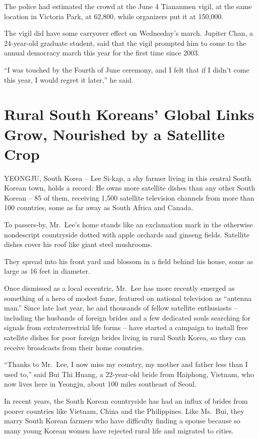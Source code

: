 ﻿\documentclass[12pt]{article}
\begin{document}
The police had estimated the crowd at the June 4 Tiananmen vigil, at the same location in Victoria
Park, at 62,800, while organizers put it at 150,000.

The vigil did have some carryover effect on Wednesday's march. Jupiter Chan, a 24-year-old graduate
student, said that the vigil prompted him to come to the annual democracy march this year for the
first time since 2003.

``I was touched by the Fourth of June ceremony, and I felt that if I didn't come this year, I would
regret it later,'' he said.

\section{Rural South Koreans' Global Links Grow, Nourished by a Satellite Crop}

YEONGJU, South Korea -- Lee Si-kap, a shy farmer living in this central South Korean town, holds a
record: He owns more satellite dishes than any other South Korean -- 85 of them, receiving 1,500
satellite television channels from more than 100 countries, some as far away as South Africa and
Canada.

To passers-by, Mr.~Lee's home stands like an exclamation mark in the otherwise nondescript
countryside dotted with apple orchards and ginseng fields. Satellite dishes cover his roof like
giant steel mushrooms.

They spread into his front yard and blossom in a field behind his house, some as large as 16 feet in
diameter.

Once dismissed as a local eccentric, Mr.~Lee has more recently emerged as something of a hero of
modest fame, featured on national television as ``antenna man.'' Since late last year, he and
thousands of fellow satellite enthusiasts -- including the husbands of foreign brides and a few
dedicated souls searching for signals from extraterrestrial life forms -- have started a campaign to
install free satellite dishes for poor foreign brides living in rural South Korea, so they can
receive broadcasts from their home countries.

``Thanks to Mr.~Lee, I now miss my country, my mother and father less than I used to,'' said Bui Thi
Huang, a 22-year-old bride from Haiphong, Vietnam, who now lives here in Yeongju, about 100 miles
southeast of Seoul.

In recent years, the South Korean countryside has had an influx of brides from poorer countries like
Vietnam, China and the Philippines. Like Ms.~Bui, they marry South Korean farmers who have
difficulty finding a spouse because so many young Korean women have rejected rural life and migrated
to cities.
\end{document}
